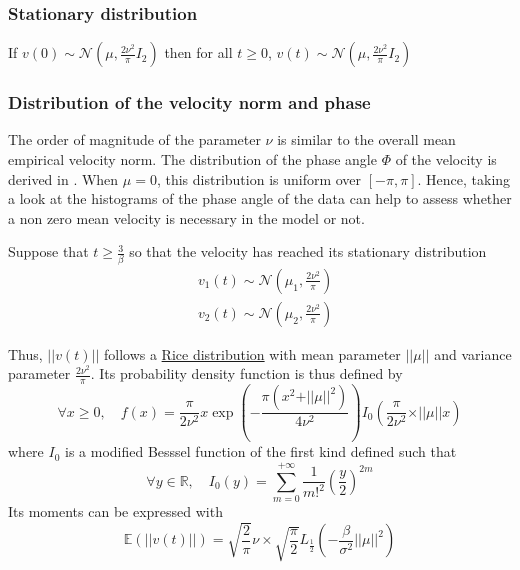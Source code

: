 \documentclass[11pt]{article}
\newcommand {\R}{\mathbb{R}}
\newcommand {\E}{\mathbb{E}}
\newcommand {\1}{\mathbb{1}}
\begin{document}
\subsubsection{Stationary distribution}

If $v(0) \sim \mathcal{N}\left(\mu,\frac{2\nu^2}{\pi} I_2\right)$ then for all $t \geq 0$, $v(t) \sim \mathcal{N}\left(\mu,\frac{2\nu^2}{\pi} I_2\right)$

\subsubsection{Distribution of the velocity norm and phase}
 The order of magnitude of the parameter $\nu$ is similar to the overall mean empirical velocity norm. The distribution of the phase angle $\Phi$ of the velocity is derived in \cite{pawula_distribution_1982}.
When $\mu=0$, this distribution is uniform over $[-\pi,\pi]$. Hence, taking a look at the histograms of the phase angle of the data can help to assess whether a non zero mean velocity is necessary in the model or not.

Suppose that $t\geq \frac{3}{\beta}$ so that the velocity has reached its stationary distribution
\begin{align*}
	&v_1(t) \sim \mathcal{N}\left(\mu_1, \frac{2\nu^2}{\pi}\right) \\
	&v_2(t) \sim \mathcal{N}\left(\mu_2, \frac{2\nu^2}{\pi}\right)
\end{align*}

\begin{figure}[H]
	\centering
\end{figure}
Thus, $ \vert \vert v(t) \vert \vert$ follows a \href{https://en.wikipedia.org/wiki/Rice_distribution}{Rice distribution} with mean parameter $\vert \vert \mu \vert \vert$ and variance parameter $\frac{2\nu^2}{\pi}$. Its probability density function is thus defined by
\[\forall x \geq 0, \quad f(x)= \frac{\pi}{2\nu^2}x \exp\left(-\frac{\pi (x^2+ \vert \vert \mu \vert \vert^2)}{4\nu^2}\right) I_{0}\left(   \frac{\pi}{2\nu^2}\times \vert \vert \mu \vert \vert x \right)\]
where $I_0$ is a modified Besssel function of the first kind defined such that 
\[\forall y  \in \R, \quad I_0(y)=\sum_{m=0}^{+\infty} \frac{1}{m!^2}\left(\frac{y}{2}\right)^{2m}\]
Its moments can be expressed with
\[\E\left(\vert \vert v(t) \vert \vert\right)=\sqrt{\frac{2}{\pi}}\nu \times \sqrt{\frac{\pi}{2}} L_{\frac{1}{2}} \left( -\frac{\beta}{\sigma^2} \vert \vert \mu \vert \vert ^2 \right)\]
\end{document}
